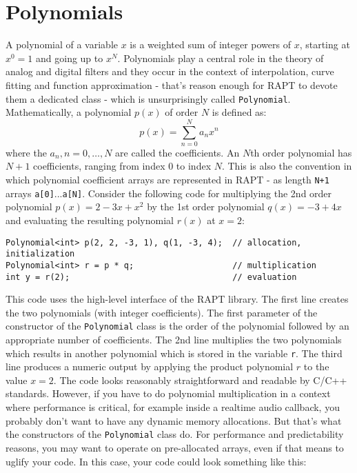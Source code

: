 \section{Polynomials}
A polynomial of a variable $x$ is a weighted sum of integer powers of $x$, starting at $x^0 = 1$ and going up to $x^N$. Polynomials play a central role in the theory of analog and digital filters and they occur in the context of interpolation, curve fitting and function approximation - that's reason enough for RAPT to devote them a dedicated class - which is unsurprisingly called \texttt{Polynomial}. Mathematically, a polynomial $p(x)$ of order $N$ is defined as:
\begin{equation}
	p(x) = \sum_{n=0}^N a_n x^n
\end{equation}
where the $a_n, n=0,\ldots,N$ are called the coefficients. An $N$th order polynomial has $N+1$ coefficients, ranging from index $0$ to index $N$. This is also the convention in which polynomial coefficient arrays are represented in RAPT - as length \texttt{N+1} arrays \texttt{a[0]}...\texttt{a[N]}.  Consider the following code for multiplying the 2nd order polynomial $p(x) = 2 - 3 x + x^2$ by the 1st order polynomial $q(x) = -3 + 4x$ and evaluating the resulting polynomial $r(x)$ at $x = 2$:
\begin{lstlisting}
Polynomial<int> p(2, 2, -3, 1), q(1, -3, 4);  // allocation, initialization
Polynomial<int> r = p * q;                    // multiplication
int y = r(2);                                 // evaluation
\end{lstlisting}
This code uses the high-level interface of the RAPT library. The first line creates the two polynomials (with integer coefficients). The first parameter of the constructor of the \texttt{Polynomial} class is the order of the polynomial followed by an appropriate number of coefficients. The 2nd line multiplies the two polynomials which results in another polynomial which is stored in the variable \texttt{r}. The third line produces a numeric output by applying the product polynomial $r$ to the value $x=2$. The code looks reasonably straightforward and readable by C/C++ standards. However, if you have to do polynomial multiplication in a context where performance is critical, for example inside a realtime audio callback, you probably don't want to have any dynamic memory allocations. But that's what the constructors of the \texttt{Polynomial} class do. For performance and predictability reasons, you may want to operate on pre-allocated arrays, even if that means to uglify your code. In this case, your code could look something like this:
